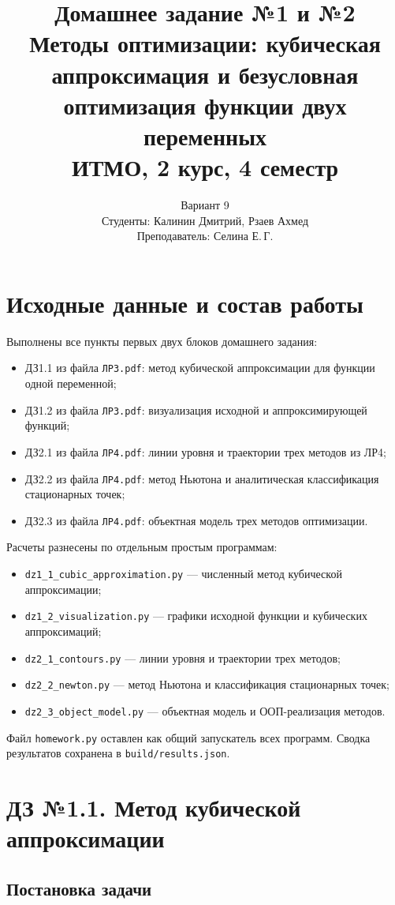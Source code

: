 \documentclass[12pt,a4paper]{article}
\title{\textbf{Домашнее задание №1 и №2}\\
\large Методы оптимизации: кубическая аппроксимация и безусловная оптимизация функции двух переменных\\[0.5em]
\normalsize ИТМО, 2 курс, 4 семестр}
\author{%
  Вариант 9\\[0.4em]
  Студенты: Калинин Дмитрий, Рзаев Ахмед\\
  Преподаватель: Селина Е.\,Г.
}
\date{}
\begin{document}
\maketitle
\tableofcontents
\newpage

\section{Исходные данные и состав работы}

Выполнены все пункты первых двух блоков домашнего задания:
\begin{itemize}
  \item ДЗ1.1 из файла \texttt{ЛР3.pdf}: метод кубической аппроксимации для функции одной переменной;
  \item ДЗ1.2 из файла \texttt{ЛР3.pdf}: визуализация исходной и аппроксимирующей функций;
  \item ДЗ2.1 из файла \texttt{ЛР4.pdf}: линии уровня и траектории трех методов из ЛР4;
  \item ДЗ2.2 из файла \texttt{ЛР4.pdf}: метод Ньютона и аналитическая классификация стационарных точек;
  \item ДЗ2.3 из файла \texttt{ЛР4.pdf}: объектная модель трех методов оптимизации.
\end{itemize}

Расчеты разнесены по отдельным простым программам:
\begin{itemize}
  \item \texttt{dz1\_1\_cubic\_approximation.py} --- численный метод кубической аппроксимации;
  \item \texttt{dz1\_2\_visualization.py} --- графики исходной функции и кубических аппроксимаций;
  \item \texttt{dz2\_1\_contours.py} --- линии уровня и траектории трех методов;
  \item \texttt{dz2\_2\_newton.py} --- метод Ньютона и классификация стационарных точек;
  \item \texttt{dz2\_3\_object\_model.py} --- объектная модель и ООП-реализация методов.
\end{itemize}
Файл \texttt{homework.py} оставлен как общий запускатель всех программ. Сводка результатов сохранена в \texttt{build/results.json}.

\section{ДЗ №1.1. Метод кубической аппроксимации}

\subsection{Постановка задачи}
\end{document}
